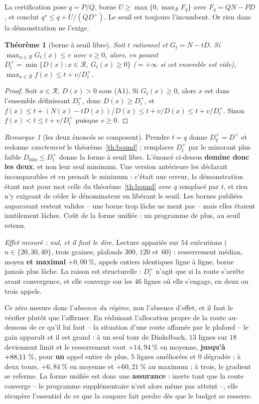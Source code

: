 \documentclass[11pt,a4paper]{article}
\theoremstyle{plain}
\newtheorem{theorem}{Théorème}
\theoremstyle{remark}
\newtheorem{remark}{Remarque}
\newcommand{\Rcal}{\mathcal{R}}
\newcommand{\qs}{q^{\star}}
\begin{document}
La certification pose $q=P/Q$, borne $U\ge\max\{0,\max_{\Rcal}F_q\}$ avec
$F_q=QN-PD$, et conclut $\qs\le q+U/(QD^{+})$. Le seuil est toujours
l'incumbent. Or rien dans la démonstration ne l'exige.

\begin{theorem}[borne à seuil libre]
\label{th:seuillibre}
Soit $t$ rationnel et $G_t=N-tD$. Si $\max_{x\in\Rcal}G_t(x)\le v$ avec
$v\ge0$, alors, en posant
$D^{+}_{t}=\min\{D(x):x\in\Rcal,\ G_t(x)\ge0\}$ ($=+\infty$ si cet ensemble
est vide), $\max_{x\in\Rcal}f(x)\le t+v/D^{+}_{t}$.
\end{theorem}
\begin{proof}
Soit $x\in\Rcal$, $D(x)>0$ sous (A1). Si $G_t(x)\ge0$, alors $x$ est dans
l'ensemble définissant $D^{+}_{t}$, donc $D(x)\ge D^{+}_{t}$, et
$f(x)\le t+(N(x)-tD(x))/D(x)\le t+v/D(x)\le t+v/D^{+}_{t}$. Sinon
$f(x)<t\le t+v/D^{+}_{t}$ puisque $v\ge0$.
\end{proof}

\begin{remark}[les deux énoncés se composent]
Prendre $t=q$ donne $D^{+}_{q}=D^{+}$ et redonne \emph{exactement} le
théorème~\ref{th:bound} ; remplacer $D^{+}_{t}$ par le minorant plus faible
$D_{\min}\le D^{+}_{t}$ donne la forme à seuil libre. L'énoncé ci-dessus
\textbf{domine donc les deux}, et non leur seul minimum. Une version
antérieure les déclarait incomparables et en prenait le minimum : c'était
une erreur, la démonstration étant mot pour mot celle du
théorème~\ref{th:bound} avec $q$ remplacé par $t$, et rien n'y exigeant de
céder le dénominateur en libérant le seuil. Les bornes publiées auparavant
restent valides -- une borne trop lâche ne ment pas -- mais elles étaient
inutilement lâches. Coût de la forme unifiée : un programme de plus, au
seuil retenu.

\emph{Effet mesuré : nul, et il faut le dire.} Lecture appariée sur
$54$ exécutions ($n\in\{20,30,40\}$, trois graines, plafonds $300$, $120$
et~$60$) : resserrement médian, moyen \textbf{et maximal} $+0{,}00\ \%$,
appels entiers identiques ligne à ligne, borne jamais plus lâche. La raison
est structurelle : $D^{+}_{t}$ n'agit que si la route s'arrête avant
convergence, et elle converge sur les $46$ lignes où elle s'engage, en deux
ou trois appels.

Ce zéro mesure donc l'\emph{absence du régime}, non l'absence d'effet, et il
faut le vérifier plutôt que l'affirmer. En réduisant l'allocation propre de
la route au-dessous de ce qu'il lui faut -- la situation d'une route affamée
par le plafond -- le gain apparaît et il est grand : à un seul tour de
Dinkelbach, $13$ lignes sur $18$ deviennent \textsf{limit} et le
resserrement vaut $+14{,}94\ \%$ en moyenne,
\textbf{jusqu'à $+88{,}11{}\ \%$},
pour \textbf{un} appel entier de plus, $5$ lignes améliorées et $0$
dégradée ; à deux tours, $+6{,}84\ \%$ en moyenne et $+60{,}21\ \%$ au
maximum ; à trois, le gradient se referme. La forme unifiée est donc une
\textbf{assurance} : inerte tant que la route converge -- le programme
supplémentaire n'est alors même pas atteint --, elle récupère l'essentiel de
ce que la coupure fait perdre dès que le budget se resserre.
\end{remark}
\end{document}
